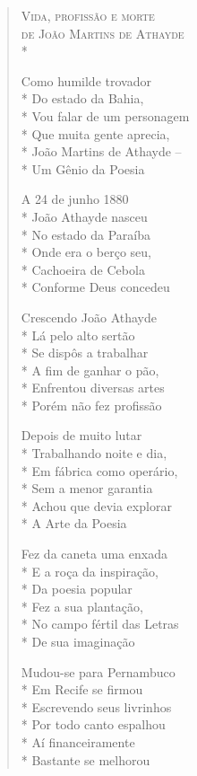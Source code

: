 \pagebreak

\begin{verse}

\textsc{Vida, profissão e morte\\ de João Martins de Athayde}\\*

\bigskip

Como humilde trovador\\*
Do estado da Bahia,\\*
Vou falar de um personagem\\*
Que muita gente aprecia,\\*
João Martins de Athayde --\\*
Um Gênio da Poesia

A 24 de junho 1880\\*
João Athayde nasceu\\*
No estado da Paraíba\\*
Onde era o berço seu,\\*
Cachoeira de Cebola\\*
Conforme Deus concedeu

Crescendo João Athayde\\*
Lá pelo alto sertão\\*
Se dispôs a trabalhar\\*
A fim de ganhar o pão,\\*
Enfrentou diversas artes\\*
Porém não fez profissão

Depois de muito lutar\\*
Trabalhando noite e dia,\\*
Em fábrica como operário,\\*
Sem a menor garantia\\*
Achou que devia explorar\\*
A Arte da Poesia

Fez da caneta uma enxada\\*
E a roça da inspiração,\\*
Da poesia popular\\*
Fez a sua plantação,\\*
No campo fértil das Letras\\*
De sua imaginação

Mudou-se para Pernambuco\\*
Em Recife se firmou\\*
Escrevendo seus livrinhos\\*
Por todo canto espalhou\\*
Aí financeiramente\\*
Bastante se melhorou


\end{verse}
